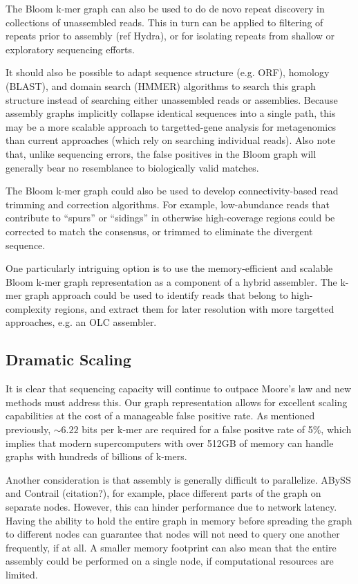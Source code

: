 \documentclass[12pt]{article} \usepackage{simplemargins}
\begin{document}
The Bloom k-mer graph can also be used to do de novo repeat discovery
in collections of unassembled reads.  This in turn can be applied to
filtering of repeats prior to assembly (ref Hydra), or for isolating
repeats from shallow or exploratory sequencing efforts.

It should also be possible to adapt sequence structure (e.g. ORF),
homology (BLAST), and domain search (HMMER) algorithms to search this
graph structure instead of searching either unassembled reads or
assemblies.  Because assembly graphs implicitly collapse identical
sequences into a single path, this may be a more scalable approach to
targetted-gene analysis for metagenomics than current approaches
(which rely on searching individual reads).  Also note that, unlike
sequencing errors, the false positives in the Bloom graph will
generally bear no resemblance to biologically valid matches.

The Bloom k-mer graph could also be used to develop connectivity-based
read trimming and correction algorithms.  For example, low-abundance
reads that contribute to ``spurs'' or ``sidings'' in otherwise
high-coverage regions could be corrected to match the
consensus, or trimmed to eliminate the divergent sequence.

One particularly intriguing option is to use the memory-efficient and
scalable Bloom k-mer graph representation as a component of a hybrid
assembler.  The k-mer graph approach could be used to identify
reads that belong to high-complexity regions, and extract them for
later resolution with more targetted approaches, e.g. an OLC assembler.

\subsection{Dramatic Scaling}
It is clear that sequencing capacity will continue to outpace Moore's 
law and new methods must address this. Our graph representation allows 
for excellent scaling capabilities at the cost of a manageable false positive rate. 
As mentioned previously, $\sim 6.22$ bits per k-mer are required for a 
false positve rate of 5\%, which implies that modern supercomputers with 
over 512GB of memory can handle graphs with hundreds of billions of k-mers.

Another consideration is that assembly is generally difficult to parallelize. 
ABySS and Contrail (citation?), for example, place different parts of the 
graph on separate nodes. However, this can hinder performance due to 
network latency. Having the ability to hold the entire graph in memory 
before spreading the graph to different nodes can guarantee that nodes 
will not need to query one another frequently, if at all. A smaller memory 
footprint can also mean that the entire assembly could be performed on 
a single node, if computational resources are limited.
\end{document}
